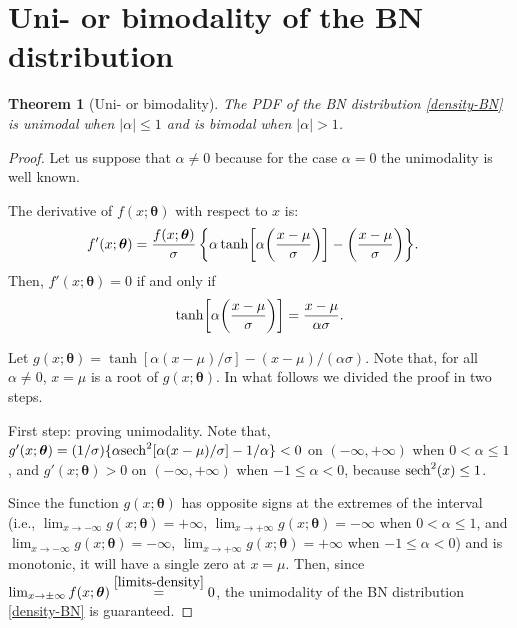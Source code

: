 \documentclass[12pt]{article}
\newtheorem{theorem}{Theorem}[section]
\theoremstyle{definition}
\begin{document}
\section{Uni- or bimodality of the BN distribution}\label{sec:bimodality}

\begin{theorem}[Uni- or bimodality]\label{Main Theorem}
The PDF of the BN distribution \eqref{density-BN} is unimodal when $\vert\alpha\vert\leq 1$ and is bimodal when $\vert\alpha\vert> 1$.
\end{theorem}
\begin{proof}
	Let us suppose that $\alpha\neq 0$ because for the case $\alpha= 0$ the unimodality is well known.
	
The derivative of $f(x;\boldsymbol{\theta})$ with respect to $x$ is:
\begin{align*}
f'(x;\boldsymbol{\theta})
&=
{f(x;\boldsymbol{\theta})\over\sigma}\,
\biggl\{\alpha\tanh\biggl[\alpha\biggl({x-\mu\over \sigma}\biggr)\biggr]- \biggl({x-\mu\over \sigma}\biggr)\biggr\}.
\end{align*}
Then, $f'(x;\boldsymbol{\theta})=0$ if and only if
\begin{align}\label{derivative}
\tanh\biggl[\alpha\biggl({x-\mu\over \sigma}\biggr)\biggr]
=
{x-\mu\over \alpha\sigma}.
\end{align}

Let $g(x;\boldsymbol{\theta})=\tanh[\alpha (x-\mu)/\sigma]-{(x-\mu)/(\alpha\sigma)}$.
Note that, for all $\alpha\neq 0$, $x=\mu$ is a root of $g(x;\boldsymbol{\theta})$. In what follows we divided the proof in two steps.

\smallskip
{\sc First step: proving unimodality.}
Note that,  $g'(x;\boldsymbol{\theta})=(1/\sigma)\{\alpha{\rm sech}^2[\alpha(x-\mu)/\sigma]-1/\alpha\}<0$ on  $(-\infty,+\infty)$ when $0<\alpha\leq 1$, and $g'(x;\boldsymbol{\theta})>0$ on $(-\infty,+\infty)$ when $-1\leq \alpha<0$, because ${\rm sech}^2(x)\leq 1$.

Since the function $g(x;\boldsymbol{\theta})$ has opposite signs at the extremes of the interval (i.e., $\lim_{x\to -\infty}g(x;\boldsymbol{\theta})=+\infty$, $\lim_{x\to +\infty}g(x;\boldsymbol{\theta})=-\infty$ when $0<\alpha\leq 1$, and $\lim_{x\to -\infty}g(x;\boldsymbol{\theta})=-\infty$, $\lim_{x\to +\infty}g(x;\boldsymbol{\theta})=+\infty$ when $-1\leq \alpha<0$) and is monotonic, it will have a single zero at $x=\mu$. Then, since $\lim_{x\to \pm\infty} f(x;\boldsymbol{\theta})\stackrel{\eqref{limits-density}}{=}0$, the unimodality of the BN distribution \eqref{density-BN} is guaranteed.



\end{proof}
\end{document}
